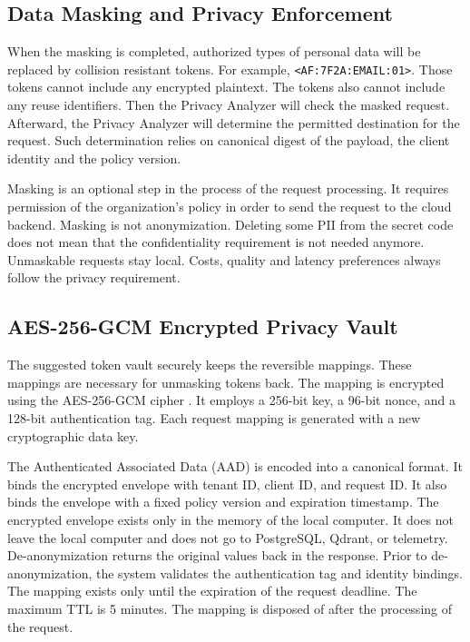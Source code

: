 \documentclass{FastFyp}
\begin{document}
\subsection{Data Masking and Privacy Enforcement}
When the masking is completed, authorized types of personal data will be replaced by collision resistant tokens.
For example, \texttt{<AF:7F2A:EMAIL:01>}.
Those tokens cannot include any encrypted plaintext.
The tokens also cannot include any reuse identifiers.
Then the Privacy Analyzer will check the masked request.
Afterward, the Privacy Analyzer will determine the permitted destination for the request.
Such determination relies on canonical digest of the payload, the client identity and the policy version.

Masking is an optional step in the process of the request processing.
It requires permission of the organization’s policy in order to send the request to the cloud backend.
Masking is not anonymization.
Deleting some PII from the secret code does not mean that the confidentiality requirement is not needed anymore.
Unmaskable requests stay local.
Costs, quality and latency preferences always follow the privacy requirement.

\subsection{AES-256-GCM Encrypted Privacy Vault}
\label{subsec:vault}
The suggested token vault securely keeps the reversible mappings.
These mappings are necessary for unmasking tokens back.
The mapping is encrypted using the AES-256-GCM cipher \cite{ref:GCM}.
It employs a 256-bit key, a 96-bit nonce, and a 128-bit authentication tag.
Each request mapping is generated with a new cryptographic data key.

The Authenticated Associated Data (AAD) is encoded into a canonical format.
It binds the encrypted envelope with tenant ID, client ID, and request ID.
It also binds the envelope with a fixed policy version and expiration timestamp.
The encrypted envelope exists only in the memory of the local computer.
It does not leave the local computer and does not go to PostgreSQL, Qdrant, or telemetry.
De-anonymization returns the original values back in the response.
Prior to de-anonymization, the system validates the authentication tag and identity bindings.
The mapping exists only until the expiration of the request deadline.
The maximum TTL is 5 minutes.
The mapping is disposed of after the processing of the request.
\end{document}
